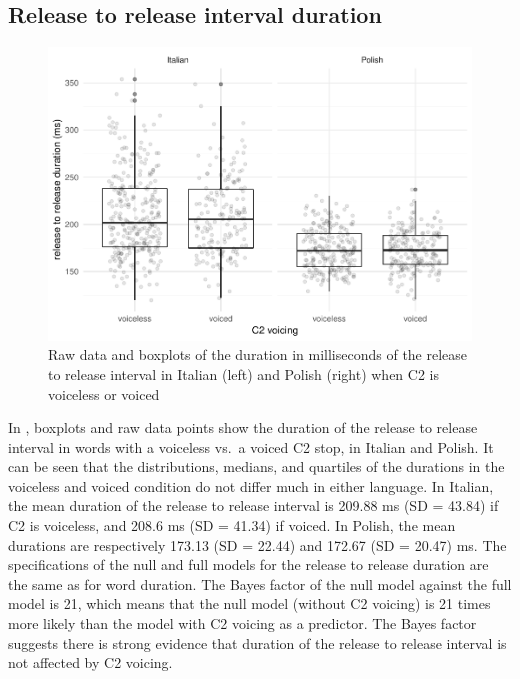 \documentclass[charis]{glossa}
\begin{document}
\hypertarget{release-to-release-interval-duration}{%
\subsection{Release to release interval
duration}\label{release-to-release-interval-duration}}

\begin{figure}
\includegraphics[width=\linewidth]{2018-relrel_files/figure-latex/Figure5} \caption{Raw data and boxplots of the duration in milliseconds of the release to release interval in Italian (left) and Polish (right) when C2 is voiceless or voiced}\label{f:Figure5}
\end{figure}

In , boxplots and raw data points show the duration of
the release to release interval in words with a voiceless vs.~a voiced
C2 stop, in Italian and Polish. It can be seen that the distributions,
medians, and quartiles of the durations in the voiceless and voiced
condition do not differ much in either language. In Italian, the mean
duration of the release to release interval is 209.88 ms (SD = 43.84) if
C2 is voiceless, and 208.6 ms (SD = 41.34) if voiced. In Polish, the
mean durations are respectively 173.13 (SD = 22.44) and 172.67 (SD =
20.47) ms. The specifications of the null and full models for the
release to release duration are the same as for word duration. The Bayes
factor of the null model against the full model is 21, which means that
the null model (without C2 voicing) is 21 times more likely than the
model with C2 voicing as a predictor. The Bayes factor suggests there is
strong evidence that duration of the release to release interval is not
affected by C2 voicing.
\end{document}

